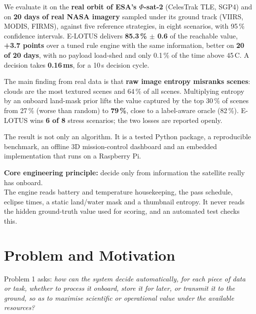 \documentclass[11pt,a4paper]{article}
\newcommand{\decmedian}{0.16}
\begin{document}
We evaluate it on the \textbf{real orbit of ESA's $\Phi$-sat-2} (CelesTrak TLE, SGP4) and on
\textbf{20 days of real NASA imagery} sampled under its ground track (VIIRS, MODIS, FIRMS), against five
reference strategies, in eight scenarios, with 95\,\% confidence intervals. E-LOTUS delivers
\textbf{85.3\,\% $\pm$ 0.6} of the reachable value, \textbf{+3.7 points} over a tuned rule engine with the
same information, better on \textbf{20 of 20 days}, with no payload load-shed and only 0.1\,\% of the
time above 45\,\textdegree C. A decision takes \textbf{\decmedian\,ms}, for a 10\,s decision cycle.

The main finding from real data is that \textbf{raw image entropy misranks scenes}: clouds are the most
textured scenes and 64\,\% of all scenes. Multiplying entropy by an onboard land-mask prior lifts the
value captured by the top 30\,\% of scenes from 27\,\% (worse than random) to \textbf{79\,\%}, close to a
label-aware oracle (82\,\%). E-LOTUS wins \textbf{6 of 8} stress scenarios; the two losses are reported
openly.

The result is not only an algorithm. It is a tested Python package, a reproducible benchmark, an offline
3D mission-control dashboard and an embedded implementation that runs on a Raspberry Pi.

\begin{keybox}
\textbf{Core engineering principle:} decide only from information the satellite really has onboard.\\
The engine reads battery and temperature housekeeping, the pass schedule, eclipse times, a static
land/water mask and a thumbnail entropy. It never reads the hidden ground-truth value used for scoring,
and an automated test checks this.
\end{keybox}

\section{Problem and Motivation}
Problem 1 asks: \emph{how can the system decide automatically, for each piece of data or task, whether to
process it onboard, store it for later, or transmit it to the ground, so as to maximise scientific or
operational value under the available resources?}
\end{document}
